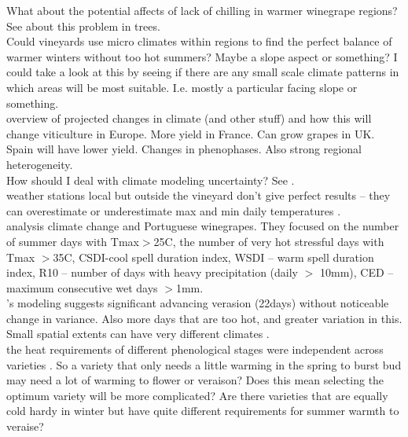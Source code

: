 \documentclass[11pt,letter]{article}
\begin{document}
What about the potential affects of lack of chilling in warmer winegrape regions? See \cite{Luedeling2009} about this problem in trees. \\ 

Could vineyards use micro climates within regions to find the perfect balance of warmer winters without too hot summers? Maybe a slope aspect or something? I could take a look at this by seeing if there are any small scale climate patterns in which areas will be most suitable. I.e. mostly a particular facing slope or something. \\

\cite{Fraga2016a} overview of projected changes in climate (and other stuff) and how this will change viticulture in Europe. More yield in France. Can grow grapes in UK. Spain will have lower yield. Changes in phenophases. Also strong regional heterogeneity. \\ 

How should I deal with climate modeling uncertainty? See \cite{Deser2012}. \\

weather stations local but outside the vineyard don't give perfect results – they can overestimate or underestimate max and min daily temperatures \citep{Antivilo2017}. \\

\cite{Blanco-Ward2017} analysis climate change and Portuguese winegrapes. They focused on the number of summer days with Tmax$>$25\textdegree C, the number of very hot stressful days with Tmax $>$35\textdegree C, CSDI-cool spell duration index, WSDI – warm spell duration index, R10 – number of days with heavy precipitation (daily $>$ 10mm), CED – maximum consecutive wet days $>$1mm. \\

\cite{Blanco-Ward2017}'s modeling suggests significant advancing verasion (22days) without noticeable change in variance. Also more days that are too hot, and greater variation in this.  \\

Small spatial extents can have very different climates \citep{Courault2001}. \\

the heat requirements of different phenological stages were independent across varieties \citep{Duchene2010}. So a variety that only needs a little warming in the spring to burst bud may need a lot of warming to flower or veraison? Does this mean selecting the optimum variety will be more complicated? Are there varieties that are equally cold hardy in winter but have quite different requirements for summer warmth to veraise? \\
\end{document}
